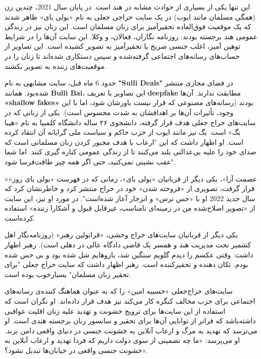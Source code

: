 این تنها یکی از بسیاری از حوادث مشابه در هند است.
در پایان سال 2021، چندین زن (همگی مسلمان مانند ایوب) در یک سایت حراجی جعلی به نام «بولی بای» ظاهر شدند که یک موقعیت فوق‌العاده تحقیرآمیز برای زنان مسلمان است.
این زنان نیز در زندگی عمومی هند برجسته بودند: روزنامه نگاران، فعالان، و وکلا.
این سایت آن‌ها را در شرایط توهین آمیز، اغلب جنسی صریح یا تحقیرآمیز به تصویر کشیده است.
این تصاویر از حساب‌های رسانه‌های اجتماعی گرفته‌شده و سپس دستکاری شده‌اند تا زنان را در موقعیت‌های زننده به تصویر بکشند.

حدود 6 ماه قبل، سایت مشابهی به نام \textenglish{\textbf{"Sulli Deals"}} در فضای مجازی منتشر شده‌بود.
همانند \textenglish{\textbf{Bulli Bai}}، این تصاویر با تعریف \textenglish{\textbf{deepfake}} مطابقت ندارند.
آن‌ها \textenglish{\textbf{«shallow fakes»}} بودند (رسانه‌های مصنوعی که قرار نیست باورشان شود، اما با این وجود، تأثیرات آن‌ها بر اهدافشان به شدت محسوس است).
یکی از زنانی که در سایت‌های حراج جعلی هدف قرار گرفته، دانشجوی ۲۶ ساله دانشگاه کلمبیا به نام «هیبا بگ» است.
بگ نیز مانند ایوب از حزب حاکم و سیاست ملی گرایانه آن انتقاد کرده است.
او اظهار داشت که این "ارعاب با هدف مجبور کردن زنان مسلمانی است که صدای خود را علیه بی‌عدالتی بلند می‌کنند تا از زندگی عمومی کناره گیری کنند.
اما شما عقب نشینی نمی‌کنید، حتی اگر همه چیز طاقت‌فرسا شود".

«عصمت آرا»، یکی دیگر از قربانیان «بولی بای»، زمانی که در فهرست «بولی بای روز» قرار گرفت، تصویری از «فروخته شدن» خود در حراج منتشر کرد و خاطرنشان کرد که سال جدید 2022 او با «حس ترس» و انزجار آعاز شده‌است".
در مورد او نیز، این سایت از «تصویر اصلاح‌شده من در زمینه‌ای نامناسب، غیرقابل قبول و آشکارا زننده» استفاده کرده‌است.

یکی دیگر از قربانیان سایت‌های حراج وحشی، «قراتولین رهبر» (روزنامه‌نگار اهل کشمیر تحت مدیریت هند و همسر یک قاضی دادگاه عالی در دهلی است).
رهبر اظهار داشت: وقتی عکسم را دیدم گلویم سنگین شد، بازوهایم شل شده بود و بی حس شده بودم.
تکان دهنده و تحقیرکننده است.
رهبر اظهار داشت که سایت حراج جعلی "برای تحقیر زنان مسلمان" بسیار‌خوب بوده است.

سایت‌های حراج‌جعلی «حسیبه امین» را که به عنوان هماهنگ کننده‌ی رسانه‌های اجتماعی برای حزب مخالف کنگره کار می‌کند نیز هدف قرار داده‌اند.
او نگران است که استفاده از این سایت‌ها برای ترویج خشونت و تهدید علیه زنان اقلیت عواقبی داشته‌باشد که فراتر از توانایی آن‌ها برای تحقیر و سانسور زنان برجسته هندی است.
او می‌ترسد که تهدید به مرگ و ارعاب آنلاین به خشونت جنسی در دنیای واقعی دامن بزند.
او می‌پرسد: «ما چه تضمینی از سوی دولت داریم که فردا تهدید و ارعاب آنلاین به خشونت جنسی واقعی در خیابان‌ها تبدیل نشود؟».
\newline
\newline
\newline


